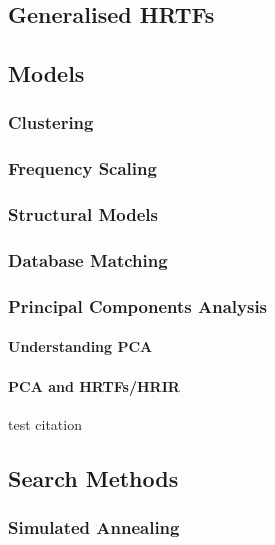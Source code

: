 \subsection{Generalised HRTFs}


\subsection{Models}

\subsubsection{Clustering}

\subsubsection{Frequency Scaling}

\subsubsection{Structural Models}

\subsubsection{Database Matching}

\subsubsection{Principal Components Analysis}

\paragraph{Understanding PCA}

\paragraph{PCA and HRTFs/HRIR}
test citation \citep{Holzl2012a} 
\subsection{Search Methods}

\subsubsection{Simulated Annealing}